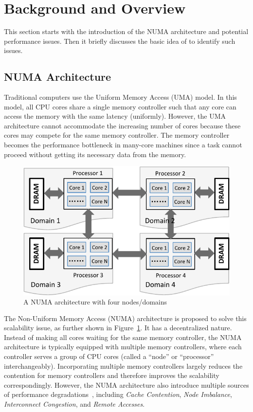 \section{Background and Overview}
\label{sec:overview}

This section starts with the introduction of the NUMA architecture and potential performance issues. Then it briefly discusses the basic idea of \NP{} to identify such issues. 

\subsection{NUMA Architecture}
\label{sec:numa}

Traditional computers use the Uniform Memory Access (UMA) model. In this model,  all CPU cores share a single memory controller such that any core can access the memory with the same latency (uniformly). However, the UMA architecture cannot accommodate the increasing number of cores because these cores may compete for the same memory controller. The memory controller becomes the performance bottleneck in many-core machines since a task cannot proceed without getting its necessary data from the memory. 

\begin{figure}[htbp]
\centering
\includegraphics[width=0.9\columnwidth]{paper/figures/Numa.pdf}
\caption{A NUMA architecture with four nodes/domains\label{fig:numa}}
\end{figure}

The Non-Uniform Memory Access (NUMA) architecture is proposed to solve this scalability issue, as further shown in Figure~\ref{fig:numa}. It has a decentralized nature. Instead of making all cores waiting for the same memory controller, the NUMA architecture is typically equipped with multiple memory controllers, where each controller serves a group of CPU cores (called a ``node'' or ``processor'' interchangeably). Incorporating multiple memory controllers largely reduces the contention for memory controllers and therefore improves the scalability correspondingly. However, the NUMA architecture also introduce multiple sources of performance degradations~\cite{Blagodurov:2011:CNC:2002181.2002182}, including \textit{Cache Contention}, \textit{Node Imbalance}, \textit{Interconnect Congestion}, and \textit{Remote Accesses}. 

